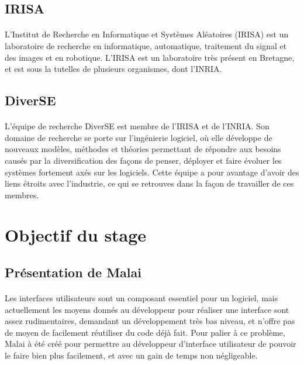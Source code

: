 \documentclass[11pt, a4paper, pdftex]{article}
\begin{document}
    \subsection{IRISA}\label{subsec:irisa}
            \paragraph{}
                L'Institut de Recherche en Informatique et Systèmes Aléatoires (IRISA) est un laboratoire de recherche en informatique, automatique,
                traitement du signal et des images et en robotique.
                L'IRISA est un laboratoire très présent en Bretagne, et est sous la tutelles de plusieurs organismes, dont l'INRIA\@.
    \vspace{1cm}
    \subsection{DiverSE}\label{subsec:diverse}
             \paragraph{}
                L'équipe de recherche DiverSE est membre de l'IRISA et de l'INRIA. Son domaine de recherche se porte sur l'ingénierie logiciel, où elle développe de nouveaux modèles,
                méthodes et théories permettant de répondre aux besoins causés par la diversification des façons de penser, déployer et faire évoluer les systèmes fortement axés sur les logiciels.
                Cette équipe a pour avantage d'avoir des liens étroits avec l'industrie, ce qui se retrouves dans la façon de travailler de ces membres.
    \newpage
    \section{Objectif du stage}\label{sec:objsta}
    \vspace{1cm}
        \subsection{Présentation de Malai}\label{subsec:premal}
            \paragraph{}
                Les interfaces utilisateurs sont un composant essentiel pour un logiciel, mais actuellement les moyens donnés au développeur pour réaliser
                une interface sont assez rudimentaires, demandant un développement très bas niveau, et n'offre pas de moyen de facilement réutiliser du code déjà fait.
                Pour palier à ce problème, Malai à été créé pour permettre au développeur d'interface utilisateur de pouvoir le faire bien plus facilement, et avec un gain de temps non négligeable.
    \vspace{1cm}
\end{document}
